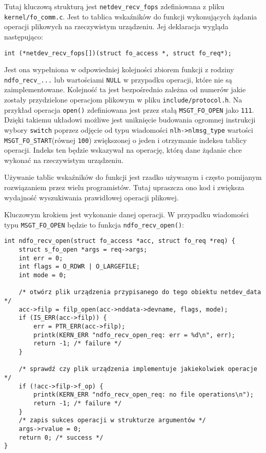 \documentclass[10pt]{article}
\begin{document}
Tutaj kluczową strukturą jest \texttt{netdev\_recv\_fops} zdefiniowana z pliku \texttt{kernel/fo\_comm.c}. Jest to tablica wskaźników do funkcji wykonujących żądania operacji plikowych na rzeczywistym urządzeniu. Jej deklaracja wygląda następująco:

\begin{verbatim}
int (*netdev_recv_fops[])(struct fo_access *, struct fo_req*);
\end{verbatim}

Jest ona wypełniona w odpowiedniej kolejności zbiorem funkcji z rodziny \texttt{ndfo\_recv\_...} lub wartościami \texttt{NULL} w przypadku operacji, które nie są zaimplementowane. Kolejność ta jest bezpośrednio zależna od numerów jakie zostały przydzielone operacjom plikowym w pliku \texttt{include/protocol.h}. Na przykład operacja \texttt{open()} zdefiniowana jest przez stałą \texttt{MSGT\_FO\_OPEN} jako \texttt{111}.  Dzięki takiemu układowi możliwe jest uniknięcie budowania ogromnej instrukcji wybory \texttt{switch} poprzez odjęcie od typu wiadomości \texttt{nlh-\textgreater{}nlmsg\_type} wartości \texttt{MSGT\_FO\_START}(równej \texttt{100}) zwiększonej o jeden i otrzymanie indeksu tablicy operacji. Indeks ten będzie wskazywał na operację, którą dane żądanie chce wykonać na rzeczywistym urządzeniu.

Używanie tablic wskaźników do funkcji jest rzadko używanym i często pomijanym rozwiązaniem przez wielu programistów. Tutaj upraszcza ono kod i zwiększa wydajność wyszukiwania prawidłowej operacji plikowej.

Kluczowym krokiem jest wykonanie danej operacji. W przypadku wiadomości typu \texttt{MSGT\_FO\_OPEN} będzie to funkcja \texttt{ndfo\_recv\_open()}:

\begin{verbatim}
int ndfo_recv_open(struct fo_access *acc, struct fo_req *req) {
    struct s_fo_open *args = req->args;
    int err = 0;
    int flags = O_RDWR | O_LARGEFILE;
    int mode = 0;

    /* otwórz plik urządzenia przypisanego do tego obiektu netdev_data */
    acc->filp = filp_open(acc->nddata->devname, flags, mode);
    if (IS_ERR(acc->filp)) {
        err = PTR_ERR(acc->filp);
        printk(KERN_ERR "ndfo_recv_open_req: err = %d\n", err);
        return -1; /* failure */
    }

    /* sprawdź czy plik urządzenia implementuje jakiekolwiek operacje */
    if (!acc->filp->f_op) {
        printk(KERN_ERR "ndfo_recv_open_req: no file operations\n");
        return -1; /* failure */
    }
    /* zapis sukces operacji w strukturze argumentów */
    args->rvalue = 0;
    return 0; /* success */
}
\end{verbatim}
\end{document}
